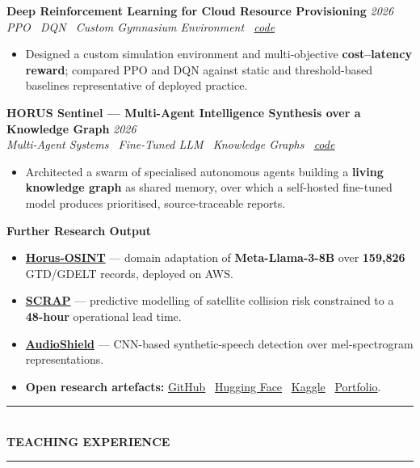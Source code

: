 \documentclass[10pt, a4paper]{article}
\newcommand{\cvsection}[1]{%
  \vspace{3pt}%
  {\color{navy}\rule{\linewidth}{1.1pt}}\\[0.5pt]%
  {\color{navy}\bfseries\fontsize{9.5}{11}\selectfont\uppercase{#1}}\\[-4pt]%
  {\color{teal}\rule{\linewidth}{0.6pt}}%
  \vspace{2pt}%
}
\newcommand{\cvproject}[3]{%
  \vspace{2.5pt}%
  {\bfseries\color{navy}#1} \hfill {\color{midgray}\textit{#3}}\\[-1.5pt]%
  {\color{teal}\textit{#2}}%
}
\newcommand{\cvmini}[2]{\item {\bfseries\color{navy}#1} --- #2}
\newenvironment{cvitems}{%
  \begin{itemize}[leftmargin=11pt, itemsep=0.5pt, parsep=0pt, topsep=1pt,
                  label={\textcolor{teal}{$\bullet$}}]
}{%
  \end{itemize}%
}
\begin{document}
\cvproject{Deep Reinforcement Learning for Cloud Resource Provisioning}
          {PPO \textperiodcentered\ DQN \textperiodcentered\ Custom Gymnasium Environment \textperiodcentered\ \href{https://github.com/MahmoudAlyosify/RL-Cloud-Autoscaler}{code}}
          {2026}
\begin{cvitems}
  \item Designed a custom simulation environment and multi-objective \textbf{cost--latency reward}; compared PPO and DQN against static and threshold-based baselines representative of deployed practice.
\end{cvitems}

\cvproject{HORUS Sentinel --- Multi-Agent Intelligence Synthesis over a Knowledge Graph}
          {Multi-Agent Systems \textperiodcentered\ Fine-Tuned LLM \textperiodcentered\ Knowledge Graphs \textperiodcentered\ \href{https://github.com/MahmoudAlyosify/horus-sentinel}{code}}
          {2026}
\begin{cvitems}
  \item Architected a swarm of specialised autonomous agents building a \textbf{living knowledge graph} as shared memory, over which a self-hosted fine-tuned model produces prioritised, source-traceable reports.
\end{cvitems}

\vspace{3pt}
{\bfseries\color{navy}Further Research Output}
\begin{cvitems}
  \cvmini{\href{https://github.com/MahmoudAlyosify/Horus-OSINT}{Horus-OSINT}}{domain adaptation of \textbf{Meta-Llama-3-8B} over \textbf{159,826} GTD/GDELT records, deployed on AWS.}
  \cvmini{\href{https://github.com/MahmoudAlyosify/SCRAP-Satellite-Collision-Risk-Assessment-and-Prediction}{SCRAP}}{predictive modelling of satellite collision risk constrained to a \textbf{48-hour} operational lead time.}
  \cvmini{\href{https://github.com/MahmoudAlyosify/AudioShield}{AudioShield}}{CNN-based synthetic-speech detection over mel-spectrogram representations.}
  \item \textbf{Open research artefacts:} \href{https://github.com/MahmoudAlyosify}{GitHub} \textperiodcentered\ \href{https://huggingface.co/mahmoudalyosify}{Hugging Face} \textperiodcentered\ \href{https://kaggle.com/mahmoudalyosify}{Kaggle} \textperiodcentered\ \href{https://mahmoudalyosifysite.github.io/}{Portfolio}.
\end{cvitems}

\cvsection{Teaching Experience}
\end{document}
